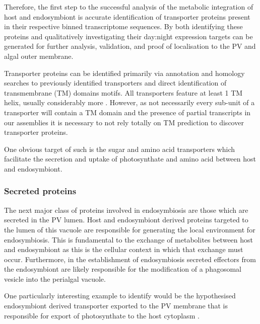 Therefore, the first step to the successful analysis of the metabolic
integration of host and endosymbiont is accurate identification of
transporter proteins present in their respective binned transcriptome
sequences.   By both identifying these proteins 
and qualitatively investigating their day:night expression
targets can be generated for further analysis, validation, and 
proof of localisation to the PV and algal outer
membrane.  


Transporter proteins can be identified
primarily via annotation and homology searches to previously
identified transporters \citep{Saier2006,Saier2009,Saier2014} 
and direct identification of transmembrane (TM) domains motifs. 
All transporters feature at least 1 TM helix, usually considerably
more \citep{VonHeijne2006}.  However, as not necessarily every sub-unit of
a transporter will contain a TM domain and the presence of partial transcripts
in our assemblies it is necessary to not rely totally on TM prediction to discover
transporter proteins.

One obvious target of such is the sugar and amino acid transporters which facilitate the
secretion and uptake of photosynthate and amino acid between host and endosymbiont.

\subsubsection{Secreted proteins}

The next major class of proteins involved in endosymbiosis
are those which are secreted in the PV lumen. 
Host and endosymbiont derived proteins targeted to the lumen of
this vacuole are responsible for generating the local environment
for endosymbiosis.  This is fundamental to the exchange of metabolites
between host and endosymbiont as this is the cellular context 
in which that exchange must occur.  Furthermore, in the establishment
of endosymbiosis secreted effectors from the endosymbiont
are likely responsible for the modification of a phagosomal vesicle into 
the perialgal vacuole. 

One particularly interesting example to identify would be the 
hypothesised endosymbiont derived transporter exported
to the PV membrane that is responsible for export
of photosynthate to the host cytoplasm \citep{Kodama2008}.

